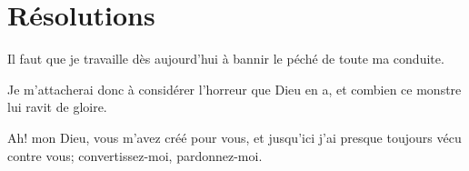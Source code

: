 \documentclass[instructions.tex]{subfiles}
\begin{document}
\section{Résolutions}

Il faut que je travaille dès aujourd'hui à bannir le péché de toute ma conduite.

\primo Je m'attacherai donc à considérer l'horreur que Dieu en a, et combien ce monstre lui ravit de gloire.

\secundo Ah! mon Dieu, vous m'avez créé pour vous, et jusqu'ici j'ai presque toujours vécu contre vous; convertissez-moi, pardonnez-moi.
\end{document}
